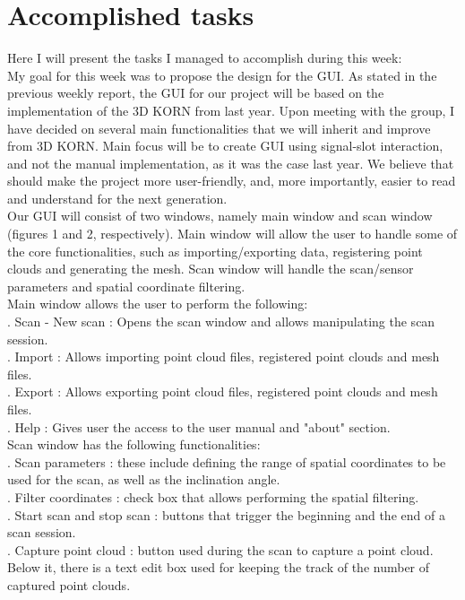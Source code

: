 \documentclass[aps,letterpaper,11pt]{revtex4}
\begin{document}
\section {Accomplished tasks}
Here I will present the tasks I managed to accomplish during this week:\\
\linebreak
My goal for this week was to propose the design for the GUI. As stated in the previous weekly report, the GUI for our project will be based on the implementation of the 3D KORN from last year. Upon meeting with the group, I have decided on several main functionalities that we will inherit and improve from 3D KORN. Main focus will be to create GUI using signal-slot interaction, and not the manual implementation, as it was the case last year. We believe that should make the project more user-friendly, and, more importantly, easier to read and understand for the next generation. \\ 
\linebreak 
Our GUI will consist of two windows, namely main window and scan window (figures 1 and 2, respectively). Main window will allow the user to handle some of the core functionalities, such as importing/exporting data, registering point clouds and generating the mesh. Scan window will handle the scan/sensor parameters and spatial coordinate filtering.  \\
\linebreak
Main window allows the user to perform the following:\\
. Scan - New scan : Opens the scan window and allows manipulating the scan session.\\
. Import : Allows importing point cloud files, registered point clouds and mesh files.\\
. Export : Allows exporting point cloud files, registered point clouds and mesh files.\\
. Help : Gives user the access to the user manual and "about" section.\\
\linebreak
Scan window has the following functionalities:\\
. Scan parameters : these include defining the range of spatial coordinates to be used for the scan, as well as the inclination angle.\\
. Filter coordinates : check box that allows performing the spatial filtering.\\
. Start scan and stop scan : buttons that trigger the beginning and the end of a scan session.\\
. Capture point cloud : button used during the scan to capture a point cloud. Below it, there is a text edit box used for keeping the track of the number of captured point clouds.
\end{document}
